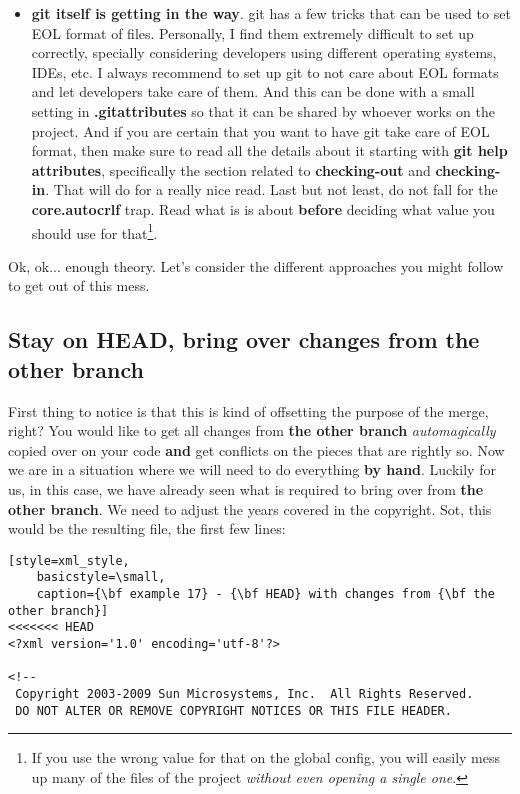 \begin{itemize}
	\item {\bf git itself is getting in the way}. git has a few tricks that can be used to set EOL format of files. Personally,
	I find them extremely difficult to set up correctly, specially considering developers using different operating systems,
	IDEs, etc. I always recommend to set up git to not care about EOL formats and let developers take care of them. And this can
	be done with a small setting in {\bf .gitattributes} so that it can be shared by whoever works on the project. And if you are
	certain that you want to have git take care of EOL format, then make sure to read all the details about it starting with
	{\bf git help attributes}, specifically the section related to {\bf checking-out} and {\bf checking-in}. That will do for a really
	nice read. Last but not least, do not fall for the {\bf core.autocrlf} trap. Read what is is about {\bf before} deciding what
	value you should use for that\footnote{If you use the wrong value for that on the global config, you will easily mess up many of
	the files of the project {\it without even opening a single one}.}.
	
\end{itemize}

Ok, ok... enough theory. Let's consider the different approaches you might follow to get out of this mess.

\subsection*{Stay on HEAD, bring over changes from the other branch}

First thing to notice is that this is kind of offsetting the purpose of the merge, right? You would like to get all changes from
{\bf the other branch} {\it automagically} copied over on your code {\bf and} get conflicts on the pieces that are rightly so.
Now we are in a situation where we will need to do everything {\bf by hand}. Luckily for us, in this case, we have already seen what is
required to bring over from {\bf the other branch}. We need to adjust the years covered in the copyright. Sot, this would be the
resulting file, the first few lines:

\begin{lstlisting}[style=xml_style,
	basicstyle=\small,
	caption={\bf example 17} - {\bf HEAD} with changes from {\bf the other branch}]
<<<<<<< HEAD
<?xml version='1.0' encoding='utf-8'?>

<!--
 Copyright 2003-2009 Sun Microsystems, Inc.  All Rights Reserved.
 DO NOT ALTER OR REMOVE COPYRIGHT NOTICES OR THIS FILE HEADER.
\end{lstlisting}

